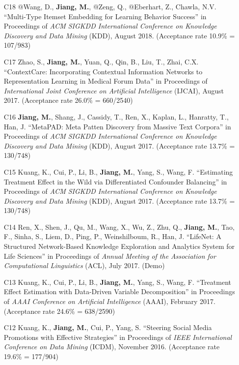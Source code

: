 \documentclass[10pt]{article}
\newenvironment{myindentpar}[1]%
{\begin{list}{}%
         {\setlength{\leftmargin}{#1}}%
         \item[]%
}
{\end{list}}
\newcounter{list}
\begin{document}
\begin{myindentpar}{0.00cm}
\begin{enumerate}[leftmargin=.5cm]
\item[C18] @Wang, D., \textbf{Jiang, M.}, @Zeng, Q., @Eberhart, Z., Chawla, N.V. ``Multi-Type Itemset Embedding for Learning Behavior Success'' in Proceedings of \textit{ACM SIGKDD International Conference on Knowledge Discovery and Data Mining} (KDD), August 2018. (Acceptance rate 10.9\% = 107/983)

\item[C17] Zhao, S., \textbf{Jiang, M.}, Yuan, Q., Qin, B., Liu, T., Zhai, C.X. ``ContextCare: Incorporating Contextual Information Networks to Representation Learning in Medical Forum Data'' in Proceedings of \textit{International Joint Conference on Artificial Intelligence} (IJCAI), August 2017. (Acceptance rate 26.0\% = 660/2540)

\item[C16] \textbf{Jiang, M.}, Shang, J., Cassidy, T., Ren, X., Kaplan, L., Hanratty, T., Han, J. ``MetaPAD: Meta Patten Discovery from Massive Text Corpora'' in Proceedings of \textit{ACM SIGKDD International Conference on Knowledge Discovery and Data Mining} (KDD), August 2017. (Acceptance rate 13.7\% = 130/748)

\item[C15] Kuang, K., Cui, P., Li, B., \textbf{Jiang, M.}, Yang, S., Wang, F. ``Estimating Treatment Effect in the Wild via Differentiated Confounder Balancing'' in Proceedings of \textit{ACM SIGKDD International Conference on Knowledge Discovery and Data Mining} (KDD), August 2017. (Acceptance rate 13.7\% = 130/748)

\item[C14] Ren, X., Shen, J., Qu, M., Wang, X., Wu, Z., Zhu, Q., \textbf{Jiang, M.}, Tao, F., Sinha, S., Liem, D., Ping, P., Weinshilboum, R., Han, J. ``LifeNet: A Structured Network-Based Knowledge Exploration and Analytics System for Life Sciences'' in Proceedings of \textit{Annual Meeting of the Association for Computational Linguistics} (ACL), July 2017. (Demo)

\item[C13] Kuang, K., Cui, P., Li, B., \textbf{Jiang, M.}, Yang, S., Wang, F. ``Treatment Effect Estimation with Data-Driven Variable Decomposition'' in Proceedings of \textit{AAAI Conference on Artificial Intelligence} (AAAI), February 2017. (Acceptance rate 24.6\% = 638/2590)

\item[C12] Kuang, K., \textbf{Jiang, M.}, Cui, P., Yang, S. ``Steering Social Media Promotions with Effective Strategies'' in Proceedings of \textit{IEEE International Conference on Data Mining} (ICDM), November 2016. (Acceptance rate 19.6\% = 177/904)


\end{enumerate}
\end{myindentpar}
\end{document}
